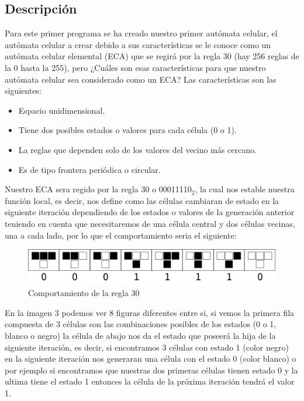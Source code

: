 \documentclass[11pt]{article}
\begin{document}
		\subsection{Descripción}
		Para este primer programa se ha creado nuestro primer autómata celular, el autómata celular a crear debido a sus características se le conoce como un autómata celular elemental (ECA) que se regirá por la regla 30 (hay 256 reglas de la 0 hasta la 255), pero ¿Cuáles son esas características para que nuestro autómata celular sea considerado como un ECA? Las características son las siguientes:
		\begin{itemize}
    		\item Espacio unidimensional.
		    \item Tiene dos posibles estados o valores para cada célula (0 o 1).
		    \item La reglas que dependen solo de los valores del vecino más cercano.
		    \item Es de tipo frontera periódica o circular.
		\end{itemize}\par
		Nuestro ECA sera regido por la regla 30 o 00011110$_2$, la cual nos estable nuestra función local, es decir, nos define como las células cambiaran de estado en la siguiente iteración dependiendo de los estados o valores de la generación anterior teniendo en cuenta que necesitaremos de una célula central y dos células vecinas, una a cada lado, por lo que el comportamiento seria el siguiente:
		\begin{figure}[H]
			\centering
			\includegraphics[scale=0.7]{resources/ElementaryCA30Rules_750.png}
			\caption{Comportamiento de la regla 30}\label{fig:picture}
		\end{figure}
		En la imagen 3 podemos ver 8 figuras diferentes entre si, si vemos la primera fila compuesta de 3 células son las combinaciones posibles de los estados (0 o 1, blanco o negro) la célula de abajo nos da el estado que poseerá la hija de la siguiente iteración, es decir, si encontramos 3 células con estado 1 (color negro) en la siguiente iteración nos generaran una célula con el estado 0 (color blanco) o por ejemplo si encontramos que nuestras dos primeras células tienen estado 0 y la ultima tiene el estado 1 entonces la célula de la próxima iteración tendrá el valor 1.\par
\end{document}
